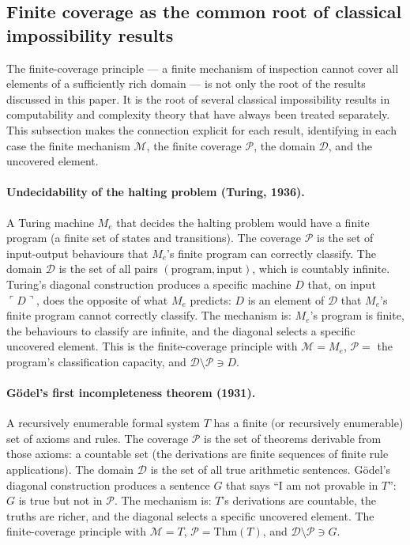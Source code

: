 \documentclass[11pt]{article}
\begin{document}
\subsection{Finite coverage as the common root of classical
impossibility results}

The finite-coverage principle --- a finite mechanism of inspection
cannot cover all elements of a sufficiently rich domain --- is not
only the root of the results discussed in this paper. It is the root of
several classical impossibility results in computability and complexity
theory that have always been treated separately. This subsection makes
the connection explicit for each result, identifying in each case the
finite mechanism $\mathcal{M}$, the finite coverage $\mathcal{P}$, the
domain $\mathcal{D}$, and the uncovered element.

\paragraph{Undecidability of the halting problem (Turing, 1936).}
A Turing machine $M_e$ that decides the halting problem would have a
finite program (a finite set of states and transitions). The coverage
$\mathcal{P}$ is the set of input-output behaviours that $M_e$'s finite
program can correctly classify. The domain $\mathcal{D}$ is the set of
all pairs $(\text{program}, \text{input})$, which is countably infinite.
Turing's diagonal construction produces a specific machine $D$ that, on
input $\ulcorner D \urcorner$, does the opposite of what $M_e$ predicts:
$D$ is an element of $\mathcal{D}$ that $M_e$'s finite program cannot
correctly classify. The mechanism is: $M_e$'s program is finite, the
behaviours to classify are infinite, and the diagonal selects a specific
uncovered element. This is the finite-coverage principle with
$\mathcal{M} = M_e$, $\mathcal{P} = $ the program's classification
capacity, and $\mathcal{D} \setminus \mathcal{P} \ni D$.

\paragraph{G\"odel's first incompleteness theorem (1931).}
A recursively enumerable formal system $T$ has a finite (or recursively
enumerable) set of axioms and rules. The coverage $\mathcal{P}$ is the
set of theorems derivable from those axioms: a countable set (the
derivations are finite sequences of finite rule applications). The
domain $\mathcal{D}$ is the set of all true arithmetic sentences.
G\"odel's diagonal construction produces a sentence $G$ that says ``I am
not provable in $T$'': $G$ is true but not in $\mathcal{P}$. The
mechanism is: $T$'s derivations are countable, the truths are richer,
and the diagonal selects a specific uncovered element. The
finite-coverage principle with $\mathcal{M} = T$,
$\mathcal{P} = \mathrm{Thm}(T)$, and
$\mathcal{D} \setminus \mathcal{P} \ni G$.
\end{document}

